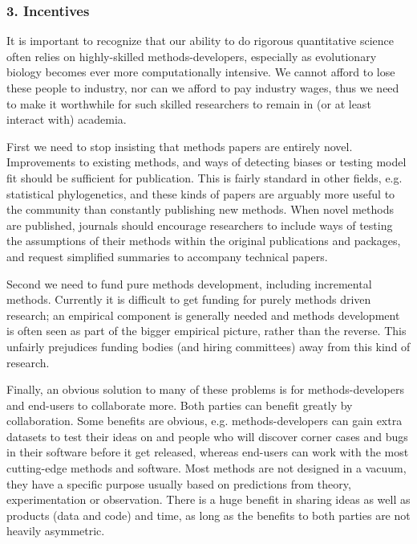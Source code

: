 \documentclass[a4paper,12pt]{article}
\begin{document}
  \subsubsection{3. Incentives}
    It is important to recognize that our ability to do rigorous quantitative science often relies on highly-skilled methods-developers, especially as evolutionary biology becomes ever more computationally intensive. 
    We cannot afford to lose these people to industry, nor can we afford to pay industry wages, thus we need to make it worthwhile for such skilled researchers to remain in (or at least interact with) academia.

    First we need to stop insisting that methods papers are entirely novel. 
    Improvements to existing methods, and ways of detecting biases or testing model fit should be sufficient for publication.
    This is fairly standard in other fields, e.g. statistical phylogenetics, and these kinds of papers are arguably more useful to the community than constantly publishing new methods.
    When novel methods are published, journals should encourage researchers to include ways of testing the assumptions of their methods within the original publications and packages, and request simplified summaries to accompany technical papers.

    Second we need to fund pure methods development, including incremental methods. 
    Currently it is difficult to get funding for purely methods driven research; an empirical component is generally needed and methods development is often seen as part of the bigger empirical picture, rather than the reverse. 
    This unfairly prejudices funding bodies (and hiring committees) away from this kind of research. 

    Finally, an obvious solution to many of these problems is for methods-developers and end-users to collaborate more. 
    Both parties can benefit greatly by collaboration. 
    Some benefits are obvious, e.g. methods-developers can gain extra datasets to test their ideas on and people who will discover corner cases and bugs in their software before it get released, whereas end-users can work with the most cutting-edge methods and software.  
    Most methods are not designed in a vacuum, they have a specific purpose usually based on predictions from theory, experimentation or observation.
    There is a huge benefit in sharing ideas as well as products (data and code) and time, as long as the benefits to both parties are not heavily asymmetric. 
\end{document}
